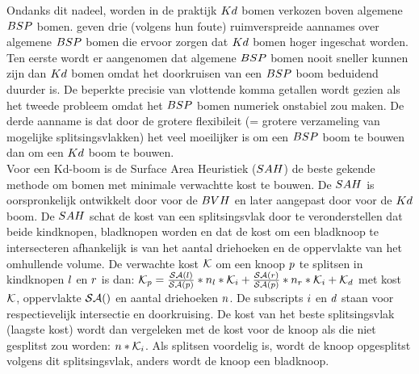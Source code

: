     Ondanks dit nadeel, worden in de praktijk $Kd$ bomen verkozen boven algemene $BSP$ bomen.
    \authorIze{} \cite{ize} geven drie (volgens hun foute) ruimverspreide aannames over algemene $BSP$ bomen die ervoor zorgen dat $Kd$ bomen hoger ingeschat worden.
    Ten eerste wordt er aangenomen dat algemene $BSP$ bomen nooit sneller kunnen zijn dan $Kd$ bomen omdat het doorkruisen van een $BSP$ boom beduidend duurder is.
    De beperkte precisie van vlottende komma getallen wordt gezien als het tweede probleem omdat het $BSP$ bomen numeriek onstabiel zou maken.
    De derde aanname is dat door de grotere flexibileit (= grotere verzameling van mogelijke splitsingsvlakken) het veel moeilijker is om een $BSP$ boom te bouwen dan om een $Kd$ boom te bouwen.
    \\

    Voor een Kd-boom is de Surface Area Heuristiek ($SAH$) de beste gekende methode om bomen met minimale verwachtte kost te bouwen.
    De $SAH$ is oorspronkelijk ontwikkelt door \authorGoldsmithSalmon{} \cite{goldsmith1987automatic} voor de $BVH$ en later aangepast door \authorMacDonaldBooth{} \cite{macdonald1990heuristics} voor de $Kd$ boom. 
    De $SAH$ schat de kost van een splitsingsvlak door te veronderstellen dat beide kindknopen, bladknopen worden en dat de kost om een bladknoop te intersecteren afhankelijk is van het aantal driehoeken en de oppervlakte van het omhullende volume.
    De verwachte kost $\mathcal{K}$ om een knoop $p$ te splitsen in kindknopen ${l}$ en ${r}$ is dan: $\mathcal{K}_p = \frac{\mathcal{SA}(l)}{\mathcal{SA}(p)}*n_l*\mathcal{K}_i + \frac{\mathcal{SA}(r)}{\mathcal{SA}(p)}*n_r*\mathcal{K}_i + \mathcal{K}_d$ met kost $\mathcal{K}$, oppervlakte $\mathcal{SA}()$ en aantal driehoeken $n$.
    De subscripts ${i}$ en ${d}$ staan voor respectievelijk intersectie en doorkruising.
    De kost van het beste splitsingsvlak (laagste kost) wordt dan vergeleken met de kost voor de knoop als die niet gesplitst zou worden: $n*\mathcal{K}_i$.
    Als splitsen voordelig is, wordt de knoop opgesplitst volgens dit splitsingsvlak, anders wordt de knoop een bladknoop.
    \\

